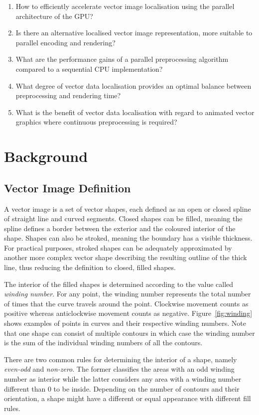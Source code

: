 \documentclass[11pt,a4paper,twoside]{article}
\begin{document}
\begin {enumerate}
\item
How to efficiently accelerate vector image localisation using the parallel architecture of the GPU?
\item
Is there an alternative localised vector image representation, more suitable to parallel encoding and rendering?
\item
What are the performance gains of a parallel preprocessing algorithm compared to a sequential CPU implementation?
\item
What degree of vector data localisation provides an optimal balance between preprocessing and rendering time?
\item
What is the benefit of vector data localisation with regard to animated vector graphics where continuous preprocessing is required?
\end {enumerate}

\section {Background}
\subsection {Vector Image Definition}

A vector image is a set of vector shapes, each defined as an open or closed spline of straight line and curved segments. Closed shapes can be filled, meaning the spline defines a border between the exterior and the coloured interior of the shape. Shapes can also be stroked, meaning the boundary has a visible thickness. For practical purposes, stroked shapes can be adequately approximated by another more complex vector shape describing the resulting outline of the thick line, thus reducing the definition to closed, filled shapes.

The interior of the filled shapes is determined according to the value called \emph{winding number}. For any point, the winding number represents the total number of times that the curve travels around the point. Clockwise movement counts as positive whereas anticlockwise movement counts as negative. Figure~\ref{fig:winding} shows examples of points in curves and their respective winding numbers. Note that one shape can consist of multiple contours in which case the winding number is the sum of the individual winding numbers of all the contours.

There are two common rules for determining the interior of a shape, namely \emph{even-odd} and \emph{non-zero}. The former classifies the areas with an odd winding number as interior while the latter considers any area with a winding number different than $0$ to be inside. Depending on the number of contours and their orientation, a shape might have a different or equal appearance with different fill rules.
\end{document}
